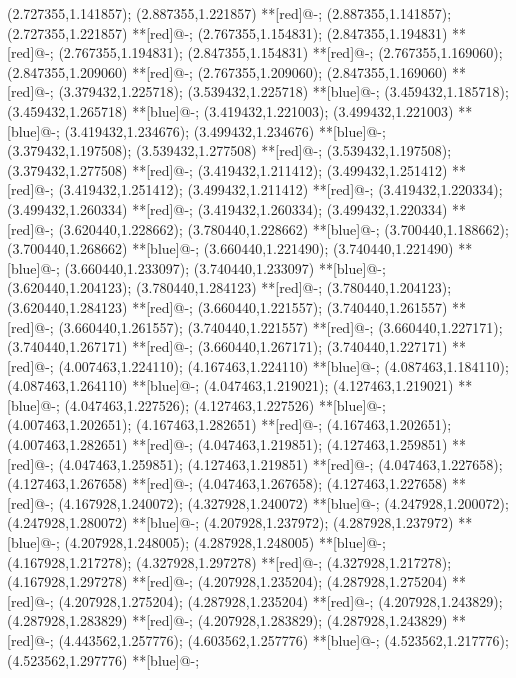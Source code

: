 (2.727355,1.141857); (2.887355,1.221857) **[red]@{-};
(2.887355,1.141857); (2.727355,1.221857) **[red]@{-};
(2.767355,1.154831); (2.847355,1.194831) **[red]@{-};
(2.767355,1.194831); (2.847355,1.154831) **[red]@{-};
(2.767355,1.169060); (2.847355,1.209060) **[red]@{-};
(2.767355,1.209060); (2.847355,1.169060) **[red]@{-};
(3.379432,1.225718); (3.539432,1.225718) **[blue]@{-};
(3.459432,1.185718); (3.459432,1.265718) **[blue]@{-};
(3.419432,1.221003); (3.499432,1.221003) **[blue]@{-};
(3.419432,1.234676); (3.499432,1.234676) **[blue]@{-};
(3.379432,1.197508); (3.539432,1.277508) **[red]@{-};
(3.539432,1.197508); (3.379432,1.277508) **[red]@{-};
(3.419432,1.211412); (3.499432,1.251412) **[red]@{-};
(3.419432,1.251412); (3.499432,1.211412) **[red]@{-};
(3.419432,1.220334); (3.499432,1.260334) **[red]@{-};
(3.419432,1.260334); (3.499432,1.220334) **[red]@{-};
(3.620440,1.228662); (3.780440,1.228662) **[blue]@{-};
(3.700440,1.188662); (3.700440,1.268662) **[blue]@{-};
(3.660440,1.221490); (3.740440,1.221490) **[blue]@{-};
(3.660440,1.233097); (3.740440,1.233097) **[blue]@{-};
(3.620440,1.204123); (3.780440,1.284123) **[red]@{-};
(3.780440,1.204123); (3.620440,1.284123) **[red]@{-};
(3.660440,1.221557); (3.740440,1.261557) **[red]@{-};
(3.660440,1.261557); (3.740440,1.221557) **[red]@{-};
(3.660440,1.227171); (3.740440,1.267171) **[red]@{-};
(3.660440,1.267171); (3.740440,1.227171) **[red]@{-};
(4.007463,1.224110); (4.167463,1.224110) **[blue]@{-};
(4.087463,1.184110); (4.087463,1.264110) **[blue]@{-};
(4.047463,1.219021); (4.127463,1.219021) **[blue]@{-};
(4.047463,1.227526); (4.127463,1.227526) **[blue]@{-};
(4.007463,1.202651); (4.167463,1.282651) **[red]@{-};
(4.167463,1.202651); (4.007463,1.282651) **[red]@{-};
(4.047463,1.219851); (4.127463,1.259851) **[red]@{-};
(4.047463,1.259851); (4.127463,1.219851) **[red]@{-};
(4.047463,1.227658); (4.127463,1.267658) **[red]@{-};
(4.047463,1.267658); (4.127463,1.227658) **[red]@{-};
(4.167928,1.240072); (4.327928,1.240072) **[blue]@{-};
(4.247928,1.200072); (4.247928,1.280072) **[blue]@{-};
(4.207928,1.237972); (4.287928,1.237972) **[blue]@{-};
(4.207928,1.248005); (4.287928,1.248005) **[blue]@{-};
(4.167928,1.217278); (4.327928,1.297278) **[red]@{-};
(4.327928,1.217278); (4.167928,1.297278) **[red]@{-};
(4.207928,1.235204); (4.287928,1.275204) **[red]@{-};
(4.207928,1.275204); (4.287928,1.235204) **[red]@{-};
(4.207928,1.243829); (4.287928,1.283829) **[red]@{-};
(4.207928,1.283829); (4.287928,1.243829) **[red]@{-};
(4.443562,1.257776); (4.603562,1.257776) **[blue]@{-};
(4.523562,1.217776); (4.523562,1.297776) **[blue]@{-};
